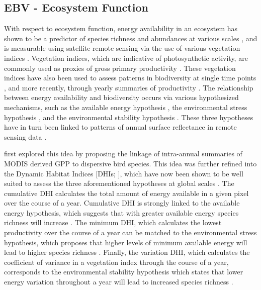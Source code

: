 \documentclass[
  authoryear,
  review,
  3p,
  twocolumn]{elsarticle}
\begin{document}
\hypertarget{ebv---ecosystem-function}{%
\subsection{EBV - Ecosystem Function}\label{ebv---ecosystem-function}}

With respect to ecosystem function, energy availability in an ecosystem
has shown to be a predictor of species richness and abundances at
various scales \citep{chase2002, radeloff2019, coops2019, razenkova},
and is measurable using satellite remote sensing via the use of various
vegetation indices \citep{huete2002, radeloff2019}. Vegetation indices,
which are indicative of photosynthetic activity, are commonly used as
proxies of gross primary productivity \citep{huang2019}. These
vegetation indices have also been used to assess patterns in
biodiversity at single time points \citep{bonn2004}, and more recently,
through yearly summaries of productivity
\citep{berry2007, radeloff2019}. The relationship between energy
availability and biodiversity occurs via various hypothesized
mechanisms, such as the available energy hypothesis
\citep{currie2004, wright1983}, the environmental stress hypothesis
\citep{currie2004}, and the environmental stability hypothesis
\citep{williams2008}. These three hypotheses have in turn been linked to
patterns of annual surface reflectance in remote sensing data
\citep{berry2007, radeloff2019}.

\citet{berry2007} first explored this idea by proposing the linkage of
intra-annual summaries of MODIS derived GPP to dispersive bird species.
This idea was further refined into the Dynamic Habitat Indices {[}DHIs;
\citet{coops2008}{]}, which have now been shown to be well suited to
assess the three aforementioned hypotheses at global scales
\citep{radeloff2019}. The cumulative DHI calculates the total amount of
energy available in a given pixel over the course of a year. Cumulative
DHI is strongly linked to the available energy hypothesis, which
suggests that with greater available energy species richness will
increase \citep{wright1983}. The minimum DHI, which calculates the
lowest productivity over the course of a year can be matched to the
environmental stress hypothesis, which proposes that higher levels of
minimum available energy will lead to higher species richness
\citep{currie2004}. Finally, the variation DHI, which calculates the
coefficient of variance in a vegetation index through the course of a
year, corresponds to the environmental stability hypothesis which states
that lower energy variation throughout a year will lead to increased
species richness \citep{williams2008}.
\end{document}
